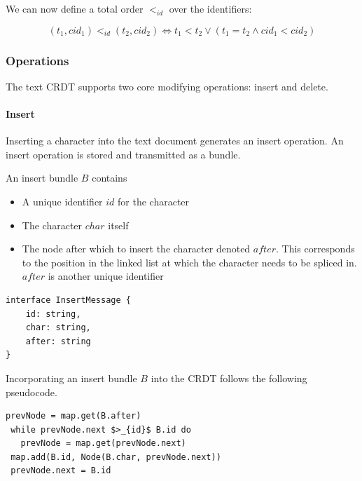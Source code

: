 \documentclass[12pt,a4paper,twoside,openright]{report}
\begin{document}
		We can now define a total order $<_{id}$ over the identifiers:
		
		\[(t_1, cid_1) <_{id} (t_2, cid_2) \Leftrightarrow t_1 < t_2 \lor (t_1 = t_2 \land cid_1 < cid_2)\]
		
		
		\subsubsection{Operations}
		The text CRDT supports two core modifying operations: insert and delete.
		
			\paragraph{Insert}
				Inserting a character into the text document generates an insert operation. An insert operation is stored and transmitted as a bundle.
				
				An insert bundle $B$ contains
				\begin{itemize}
					\item A unique identifier $id$ for the character
					\item The character $char$ itself
					\item The node after which to insert the character denoted $after$. This corresponds to the position in the linked list at which the character needs to be spliced in. $after$ is another unique identifier
				\end{itemize}
			
\vspace{3mm}	
\begin{lstlisting}[caption=Insert Bundle Type Signature]
interface InsertMessage {
    id: string,
    char: string,
    after: string
}
\end{lstlisting}
				
				Incorporating an insert bundle $B$ into the CRDT follows the following pseudocode.
				
\begin{lstlisting}[mathescape=true,caption=Incorporating Insert Bundle into CRDT]
 prevNode = map.get(B.after)
 while prevNode.next $>_{id}$ B.id do
   prevNode = map.get(prevNode.next)
 map.add(B.id, Node(B.char, prevNode.next))
 prevNode.next = B.id
\end{lstlisting}
				
\end{document}
